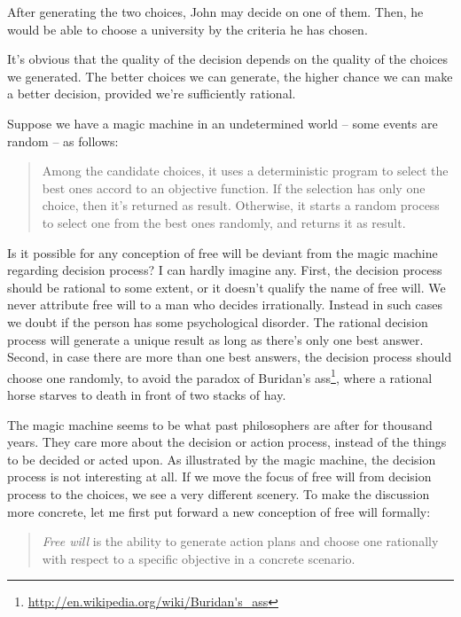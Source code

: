After generating the two choices, John may decide on one of them. Then, he would be able to choose a university by the criteria he has chosen.

It's obvious that the quality of the decision depends on the quality of the choices we generated. The better choices we can generate, the higher chance we can make a better decision, provided we're sufficiently rational.

Suppose we have a magic machine in an undetermined world  -- some events are random -- as follows:

\begin{quote}
Among the candidate choices, it uses a deterministic program to select the best ones accord to an objective function. If the selection has only one choice, then it's returned as result. Otherwise, it starts a random process to select one from the best ones randomly, and returns it as result.
\end{quote}

Is it possible for any conception of free will be deviant from the magic machine regarding decision process? I can hardly imagine any. First, the decision process should be rational to some extent, or it doesn't qualify the name of free will. We never attribute free will to a man who decides irrationally. Instead in such cases we doubt if the person has some psychological disorder. The rational decision process will generate a unique result as long as there's only one best answer. Second, in case there are more than one best answers, the decision process should choose one randomly, to avoid the paradox of Buridan's ass\footnote{\url{http://en.wikipedia.org/wiki/Buridan's_ass}}, where a rational horse starves to death in front of two stacks of hay.

The magic machine seems to be what past philosophers are after for thousand years. They care more about the decision or action process, instead of the things to be decided or acted upon. As illustrated by the magic machine, the decision process is not interesting at all. If we move the focus of free will from decision process to the choices, we see a very different scenery. To make the discussion more concrete, let me first put forward a new conception of free will formally:

\begin{quote}
\emph{Free will} is the ability to generate action plans and choose one rationally with respect to a specific objective in a concrete scenario.

\end{quote}

